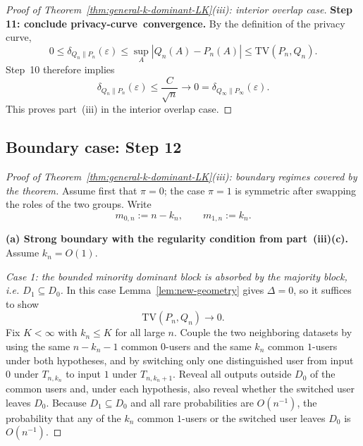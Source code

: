 \documentclass{article}
\newcommand{\TV}{\mathrm{TV}}
\newcommand{\1}{\mathbf 1}
\newcommand{\privacycurve}{\mbox{privacy-curve}}
\begin{document}
\begin{proof}[Proof of Theorem~\ref{thm:general-k-dominant-LK}(iii): interior overlap case]
\medskip
\textbf{Step 11: conclude \privacycurve\ convergence.}
By the definition of the privacy curve,
\[
0\le \delta_{Q_n\|P_n}(\varepsilon)\le \sup_A |Q_n(A)-P_n(A)|\le \TV(P_n,Q_n).
\]
Step~10 therefore implies
\[
\delta_{Q_n\|P_n}(\varepsilon)\le \frac{C}{\sqrt n}\to 0
=\delta_{Q_\infty\|P_\infty}(\varepsilon).
\]
This proves part~(iii) in the interior overlap case.
\end{proof}


\subsection*{Boundary case: Step 12}

\begin{proof}[Proof of Theorem~\ref{thm:general-k-dominant-LK}(iii): boundary regimes covered by the theorem]
Assume first that $\pi=0$; the case $\pi=1$ is symmetric after swapping the roles of the two groups.
Write
\[
m_{0,n}:=n-k_n,
\qquad
m_{1,n}:=k_n.
\]

\textbf{(a) Strong boundary with the regularity condition from part~\textup{(iii)(c)}.}
Assume $k_n=O(1)$.

\smallskip
\emph{Case 1: the bounded minority dominant block is absorbed by the majority block, i.e. $D_1\subseteq D_0$.}
In this case Lemma~\ref{lem:new-geometry} gives $\Delta=0$, so it suffices to show
\[
\TV(P_n,Q_n)\to 0.
\]
Fix $K<\infty$ with $k_n\le K$ for all large $n$. Couple the two neighboring datasets by using the same
$n-k_n-1$ common $0$-users and the same $k_n$ common $1$-users under both hypotheses, and by switching only one
distinguished user from input $0$ under $T_{n,k_n}$ to input $1$ under $T_{n,k_n+1}$. Reveal all outputs outside
$D_0$ of the common users and, under each hypothesis, also reveal whether the switched user leaves $D_0$.
Because $D_1\subseteq D_0$ and all rare probabilities are $O(n^{-1})$, the probability that any of the $k_n$
common $1$-users or the switched user leaves $D_0$ is $O(n^{-1})$.


\end{proof}
\end{document}
